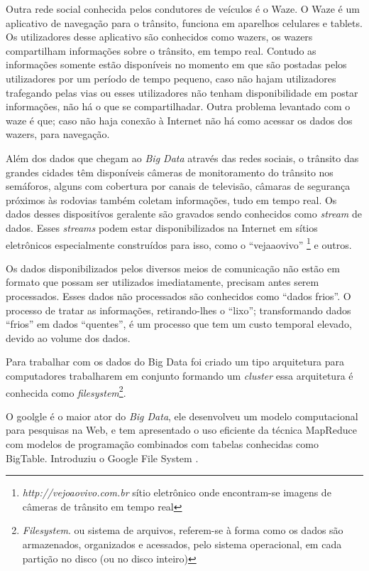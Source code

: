 \documentclass[conference,compsoc]{IEEEtran}
\begin{document}
Outra rede social conhecida pelos condutores de veículos é o Waze. O Waze é um aplicativo de navegação para o trânsito, funciona em aparelhos celulares e tablets. Os utilizadores desse aplicativo são conhecidos como wazers, os wazers compartilham informações sobre o trânsito, em tempo real. Contudo as informações somente estão disponíveis no momento em que são postadas pelos utilizadores por um período de tempo pequeno, caso não hajam utilizadores trafegando pelas vias ou esses utilizadores não tenham disponibilidade em postar informações, não há o que se compartilhadar.
Outra problema levantado com o waze é que; caso não haja conexão à Internet não há como acessar os dados dos wazers, para navegação.

Além dos dados que chegam ao \textit{Big Data} através das redes sociais, o trânsito das grandes cidades têm disponíveis câmeras de monitoramento do trânsito nos semáforos, alguns com cobertura
por canais de televisão, câmaras de segurança próximos às rodovias também coletam informações, tudo em tempo real. Os dados desses dispositívos geralente são gravados sendo conhecidos como \textit{stream} de dados. 
Esses \textit{streams} podem estar disponibilizados na Internet em sítios eletrônicos especialmente construídos para isso, como o ``vejaaovivo''
\footnote{\textit{http://vejoaovivo.com.br} sítio eletrônico onde encontram-se imagens de câmeras de trânsito em tempo real} e outros.

Os dados disponibilizados pelos diversos meios de comunicação não estão em formato que possam ser utilizados imediatamente, precisam antes serem processados. Esses dados não processados são conhecidos como ``dados frios''.
O processo de tratar as informações, retirando-lhes o ``lixo''; transformando dados ``frios'' em dados ``quentes'', é um processo que tem um custo temporal elevado, devido ao volume dos dados.

Para trabalhar com os dados do Big Data foi criado um tipo arquitetura para computadores trabalharem em conjunto formando um \textit{cluster} essa arquitetura é conhecida como \textit{filesystem}\footnote{\textit{Filesystem}. ou sistema de arquivos, referem-se à forma como os dados são armazenados, organizados e acessados, pelo sistema operacional, em cada partição no disco (ou no disco inteiro)}.

O goolgle é o maior ator do \textit{Big Data}, ele desenvolveu um modelo computacional para pesquisas na Web, e tem apresentado o uso eficiente da técnica MapReduce com modelos de programação combinados com tabelas conhecidas como BigTable. Introduziu o Google File System \cite{Filesystem}. 
\end{document}
